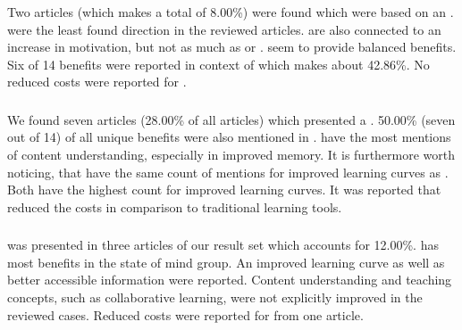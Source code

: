 \subsubsection{\ARBns}
Two articles (which makes a total of 8.00\%) were found which were based on an \ARB \appns. \ARB \apps were the least found direction in the reviewed articles. \ARB \apps are also connected to an increase in motivation, but not as much as \DBL or \OMns. \ARB seem to provide balanced benefits. Six of 14 benefits were reported in context of \ARB which makes about 42.86\%. No reduced costs were reported for \ARB \apps.

\subsubsection{\STns}
We found seven articles (28.00\% of all articles) which presented a \ST \AR \appns. 50.00\% (seven out of 14) of all unique benefits were also mentioned in \ST \appsns. \ST \apps have the most mentions of content understanding, especially in improved memory. It is furthermore worth noticing, that \ST \apps have the same count of mentions for improved learning curves as \DBL \appsns. Both have the highest count for improved learning curves. It was reported that \ST \apps reduced the costs in comparison to traditional learning tools.

\subsubsection{\ARGns}
\ARG was presented in three articles of our result set which accounts for 12.00\%. \ARG has most benefits in the state of mind group. An improved learning curve as well as better accessible information were reported. Content understanding and teaching concepts, such as collaborative learning, were not explicitly improved in the reviewed cases. Reduced costs were reported for \ARG \apps from one article.


